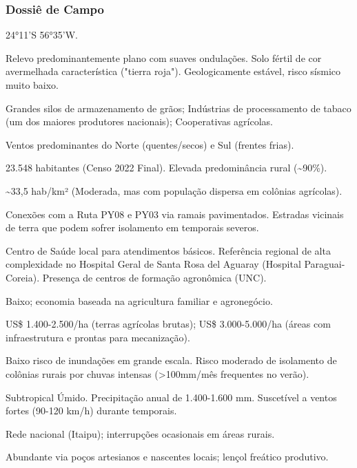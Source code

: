 \subsubsection{Dossiê de Campo}
\begin{description}[style=nextline,leftmargin=0.5cm,font=\bfseries]
\item[Coordenadas]  24°11'S 56°35'W.
\item[Topografia]  Relevo predominantemente plano com suaves ondulações. Solo fértil de cor avermelhada característica ("tierra roja"). Geologicamente estável, risco sísmico muito baixo.
\item[Alvos Estratégicos]  Grandes silos de armazenamento de grãos; Indústrias de processamento de tabaco (um dos maiores produtores nacionais); Cooperativas agrícolas.
\item[Fallout]  Ventos predominantes do Norte (quentes/\allowbreak secos) e Sul (frentes frias).
\item[População]  23.548 habitantes (Censo 2022 Final). Elevada predominância rural (\textasciitilde 90\%).
\item[Densidade]  \textasciitilde 33,5 hab/\allowbreak km² (Moderada, mas com população dispersa em colônias agrícolas).
\item[Vias de Acesso]  Conexões com a Ruta PY08 e PY03 via ramais pavimentados. Estradas vicinais de terra que podem sofrer isolamento em temporais severos.
\item[Serviços]  Centro de Saúde local para atendimentos básicos. Referência regional de alta complexidade no Hospital Geral de Santa Rosa del Aguaray (Hospital Paraguai-Coreia). Presença de centros de formação agronômica (UNC).
\item[Custo de Vida]  Baixo; economia baseada na agricultura familiar e agronegócio.
\item[Preço da Terra]  US\$ 1.400-2.500/\allowbreak ha (terras agrícolas brutas); US\$ 3.000-5.000/\allowbreak ha (áreas com infraestrutura e prontas para mecanização).
\item[Hidrologia]  Baixo risco de inundações em grande escala. Risco moderado de isolamento de colônias rurais por chuvas intensas (>100mm/\allowbreak mês frequentes no verão).
\item[Clima]  Subtropical Úmido. Precipitação anual de 1.400-1.600 mm. Suscetível a ventos fortes (90-120 km/\allowbreak h) durante temporais.
\item[Energia]  Rede nacional (Itaipu); interrupções ocasionais em áreas rurais.
\item[Água]  Abundante via poços artesianos e nascentes locais; lençol freático produtivo.

\end{description}
